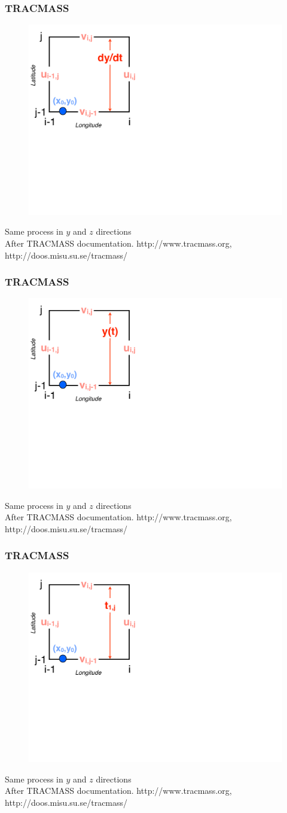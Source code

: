 \documentclass[ignorenonframetext]{beamer}
\begin{document}
\begin{frame}[t,noframenumbering]\frametitle{TRACMASS}
	\begin{figure}[htbp]
		\centering
		\includegraphics[width=.5\textwidth]{figures/tracmass_box7}
	\end{figure}
	{\Large Same process in $y$ and $z$ directions}
	\tiny{\\After TRACMASS documentation. http://www.tracmass.org, http://doos.misu.su.se/tracmass/}
\end{frame}
\begin{frame}[t,noframenumbering]\frametitle{TRACMASS}
	\begin{figure}[htbp]
		\centering
		\includegraphics[width=.5\textwidth]{figures/tracmass_box8}
	\end{figure}
	{\Large Same process in $y$ and $z$ directions}
	\tiny{\\After TRACMASS documentation. http://www.tracmass.org, http://doos.misu.su.se/tracmass/}
\end{frame}
\begin{frame}[t,noframenumbering]\frametitle{TRACMASS}
	\begin{figure}[htbp]
		\centering
		\includegraphics[width=.5\textwidth]{figures/tracmass_box9}
	\end{figure}
	{\Large Same process in $y$ and $z$ directions}
	\tiny{\\After TRACMASS documentation. http://www.tracmass.org, http://doos.misu.su.se/tracmass/}
\end{frame}
\end{document}
